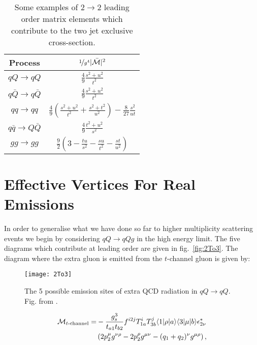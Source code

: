 	\begin{table}[htp!]
		\begin{center}
		\begin{tabular}{c | c }
		Process                 & $\nicefrac{1}{g^4}|\bar{\mathcal{M}}|^2$ \\ \hline
		$qQ\to qQ$              & $\frac{4}{9}\frac{s^2 + u^2}{t^2}$       \\
		$q\bar{Q}\to q\bar{Q}$  & $\frac{4}{9}\frac{s^2 + u^2}{t^2}$       \\
		$qq\to qq$              & $\frac{4}{9}\left(\frac{s^2 + u^2}{t^2} + \frac{s^2 + t^2}{u^2}\right) - \frac{8}{27}\frac{s^2}{ut}$\\
		$q\bar{q}\to Q\bar{Q}$  & $\frac{4}{9}\frac{t^2 + u^2}{s^2}$       \\
		$gg\to gg$              & $\frac{9}{2}\left(3-\frac{tu}{s^2}-\frac{su}{t^2}-\frac{st}{u^2}\right)$\\
		\end{tabular}
		\caption{Some examples of $2\to2$ leading order matrix elements which contribute to the
		two jet exclusive cross-section.}
		\label{tab:LOatHE}
		\end{center}
	\end{table}

\section{Effective Vertices For Real Emissions}
	\label{sec:effectiveVertices}

	In order to generalise what we have done so far to higher multiplicity scattering events we begin
	by considering $qQ\rightarrow qQg$ in the high energy limit.  The five diagrams which contribute at
	leading order are given in fig.~\eqref{fig:2To3}.  The diagram
	where the extra gluon is emitted from the $t$-channel gluon is given by:

	\begin{figure}[hbt]
		\begin{center}
		\texttt{[image: 2To3]}
		\caption{The 5 possible emission sites of extra QCD radiation in $qQ\rightarrow qQ$.
		Fig. from \cite{Andersen:2009nu}.}
		\label{fig:2To3}
		\end{center}
	\end{figure}

	\begin{align}
	\begin{split}
		\mathcal{M}_{t\text{-channel}} = &-\frac{g_s^3}{t_{a1}t_{b2}}f^{i2j}T^i_{1a}T^j_{3b}\langle 1 | \rho | a \rangle\langle 3 | \mu | b \rangle
		\epsilon^*_{2\nu}\\&\left(2p_2^\mu g^{\nu\rho} - 2p_2^\rho g^{\mu\nu} - (q_1 + q_2)^\nu g^{\mu\rho} \right),
		\label{eqn:mtchannel}
	\end{split}
	\end{align}

